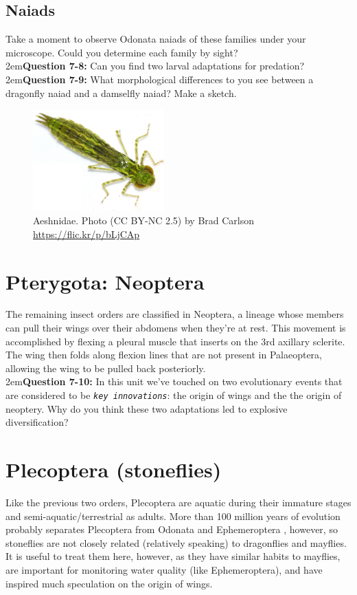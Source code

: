 \documentclass[letterpaper, 11pt]{article}
\newcommand{\latinword}[1]{\texttt{\itshape #1}}%
\begin{document}
\subsection{Naiads}
Take a moment to observe Odonata naiads of these families under your microscope. Could you determine each family by sight?\\

\hangindent2em\textbf{Question 7-8:} Can you find two larval adaptations for predation?\\

\hangindent2em\textbf{Question 7-9:} What morphological differences to you see between a dragonfly naiad and a damselfly naiad? Make a sketch.

\begin{figure}[ht!]
  \centering
    \includegraphics[width=0.45\textwidth]{AeshnidLarva}
  \caption{Aeshnidae. Photo (CC BY-NC 2.5) by Brad Carlson \url{https://flic.kr/p/bLjCAp}}
  \label{fig:OdonataLarva}
\end{figure}

\FloatBarrier

\section*{Pterygota: Neoptera}
The remaining insect orders are classified in Neoptera, a lineage whose members can pull their wings over their abdomens when they're at rest. This movement is accomplished by flexing a pleural muscle that inserts on the 3rd axillary sclerite. The wing then folds along flexion lines that are not present in Palaeoptera, allowing the wing to be pulled back posteriorly.\\

\hangindent2em\textbf{Question 7-10:} In this unit we've touched on two evolutionary events that are considered to be \latinword{key innovations}: the origin of wings and the the origin of neoptery. Why do you think these two adaptations led to explosive diversification?

\section{Plecoptera (stoneflies)}
Like the previous two orders, Plecoptera are aquatic during their immature stages and semi-aquatic/terrestrial as adults. More than 100 million years of evolution probably separates Plecoptera from Odonata and Ephemeroptera \citep{Misof763}, however, so stoneflies are not closely related (relatively speaking) to dragonflies and mayflies. It is useful to treat them here, however, as they have similar habits to mayflies, are important for monitoring water quality (like Ephemeroptera), and have inspired much speculation on the origin of wings.
\end{document}
